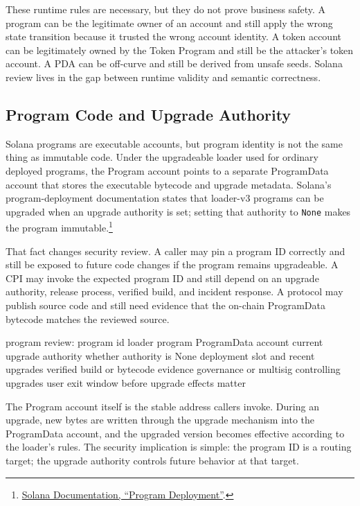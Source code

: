These runtime rules are necessary, but they do not prove business safety. A program can be the legitimate owner of an account and still apply the wrong state transition because it trusted the wrong account identity. A token account can be legitimately owned by the Token Program and still be the attacker's token account. A PDA can be off-curve and still be derived from unsafe seeds. Solana review lives in the gap between runtime validity and semantic correctness.

\subsection{Program Code and Upgrade Authority}

Solana programs are executable accounts, but program identity is not the same thing as immutable code. Under the upgradeable loader used for ordinary deployed programs, the Program account points to a separate ProgramData account that stores the executable bytecode and upgrade metadata. Solana's program-deployment documentation states that loader-v3 programs can be upgraded when an upgrade authority is set; setting that authority to \texttt{None} makes the program immutable.\footnote{\href{https://solana.com/docs/core/programs/program-deployment}{Solana Documentation, ``Program Deployment''}.}

That fact changes security review. A caller may pin a program ID correctly and still be exposed to future code changes if the program remains upgradeable. A CPI may invoke the expected program ID and still depend on an upgrade authority, release process, verified build, and incident response. A protocol may publish source code and still need evidence that the on-chain ProgramData bytecode matches the reviewed source.

\begin{codeblock}
program review:
    program id
    loader program
    ProgramData account
    current upgrade authority
    whether authority is None
    deployment slot and recent upgrades
    verified build or bytecode evidence
    governance or multisig controlling upgrades
    user exit window before upgrade effects matter
\end{codeblock}

The Program account itself is the stable address callers invoke. During an upgrade, new bytes are written through the upgrade mechanism into the ProgramData account, and the upgraded version becomes effective according to the loader's rules. The security implication is simple: the program ID is a routing target; the upgrade authority controls future behavior at that target.


